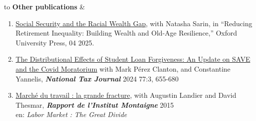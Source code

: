 \documentclass[6pt,letterpaper]{article}
\begin{document}
\begin{table}[H]
	\begin{tabu} to \textwidth {X[l]c}
		{\large \textbf{Other publications}}      &                                                                                                                                                                                                                                                                                                                                                                                                                                                                                                                                                                                                                                                                                                                                                                                                                                                                                                                                                                                                                                                                                                                                                                                                         \\ \hline
	\end{tabu}
\end{table}
\begin{enumerate}	
	\item \href{https://sylcath.github.io/sylvaincatherine.net/files/Social%20Security%20and%20Racial%20Wealth%20Gap%20Chapter%202025.pdf}{Social Security and the Racial Wealth Gap}, with Natasha Sarin,  in “Reducing Retirement Inequality: Building Wealth and Old-Age Resilience,” Oxford University Press, 04 2025.
	\vspace{.1cm}
	\item \href{https://sylcath.github.io/sylvaincatherine.net/files/shortdraft_mpc.pdf}{The Distributional Effects of Student Loan Forgiveness: An Update on SAVE and the Covid Moratorium}
	with Mark Pérez Clanton, and Constantine Yannelis, \textit{\textbf{National Tax Journal}} 2024 77:3, 655-680  
	\item \href{https://sylcath.github.io/sylvaincatherine.net/files/Montaigne.pdf}{Marché du travail : la grande fracture}, with Augustin Landier and David Thesmar, \textbf{\textit{Rapport de l'Institut Montaigne}} 2015 \vspace{.1cm} \\
	{\small  en: \textit{Labor Market : The Great Divide}} 
\end{enumerate}
\end{document}
